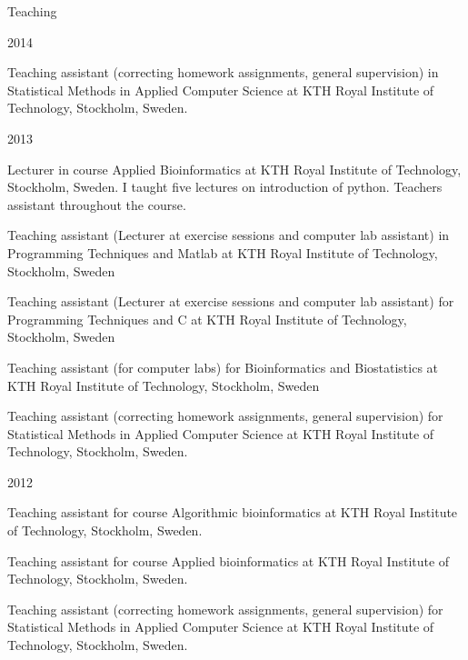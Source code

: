 \documentclass{resume} %
\begin{document}
\begin{rSection}{Teaching}

\begin{rSubsection}{2014}{}{}{}
\item Teaching assistant (correcting homework assignments, general supervision) in Statistical Methods in Applied Computer Science at KTH Royal Institute of Technology, Stockholm, Sweden.
\end{rSubsection}

\begin{rSubsection}{2013}{}{}{}
\item Lecturer in course Applied Bioinformatics at KTH Royal Institute of Technology, Stockholm, Sweden. I taught five lectures on introduction of python. Teachers assistant throughout the course. 
\item Teaching assistant (Lecturer at exercise sessions and computer lab assistant) in Programming Techniques and Matlab at KTH Royal Institute of Technology, Stockholm, Sweden
\item Teaching assistant (Lecturer at exercise sessions and computer lab assistant) for Programming Techniques and C at KTH Royal Institute of Technology, Stockholm, Sweden
\item Teaching assistant (for computer labs) for Bioinformatics and Biostatistics at KTH Royal Institute of Technology, Stockholm, Sweden
\item Teaching assistant (correcting homework assignments, general supervision) for Statistical Methods in Applied Computer Science at KTH Royal Institute of Technology, Stockholm, Sweden.
\end{rSubsection}

\begin{rSubsection}{2012}{}{}{}
\item Teaching assistant for course Algorithmic bioinformatics at KTH Royal Institute of Technology, Stockholm, Sweden. 
\item Teaching assistant for course Applied bioinformatics at KTH Royal Institute of Technology, Stockholm, Sweden.
\item Teaching assistant (correcting homework assignments, general supervision) for Statistical Methods in Applied Computer Science at KTH Royal Institute of Technology, Stockholm, Sweden.
\end{rSubsection}

\end{rSection}
\end{document}
